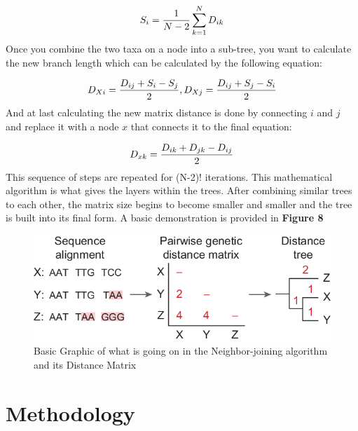 \begin{equation}
\label{computation}
S_i=\frac{1}{N-2}\sum_{k=1}^{N} D_{ik}\\
\end{equation}
Once you combine the two taxa on a node into a sub-tree, you want to calculate the new branch length which can be calculated by the following equation:

\begin{equation}
\label{branch-length}
D_{Xi} = \frac{D_{ij}+S_i-S_j}{2}, D_{Xj} = \frac{D_{ij}+S_j-S_i}{2}\\
\end{equation}
And at last calculating the new matrix distance is done by connecting $i$ and $j$ and replace it with a node $x$ that connects it to the final equation:

\begin{equation}
\label{branch-length}
D_{xk}=\frac{D_{ik}+D_{jk}-D_{ij}}{2}\\
\end{equation}
This sequence of steps are repeated for (N-2)! iterations. This mathematical algorithm is what gives the layers within the trees. After combining similar trees to each other, the matrix size begins to become smaller and smaller and the tree is built into its final form. A basic demonstration is provided in \textbf{Figure 8}

\begin{figure}[h!]
\centering
\includegraphics[width=.6\textwidth]{figures/Nj2.png}
\caption{Basic Graphic of what is going on in the Neighbor-joining algorithm and its Distance Matrix}
\end{figure}

\section{Methodology}

